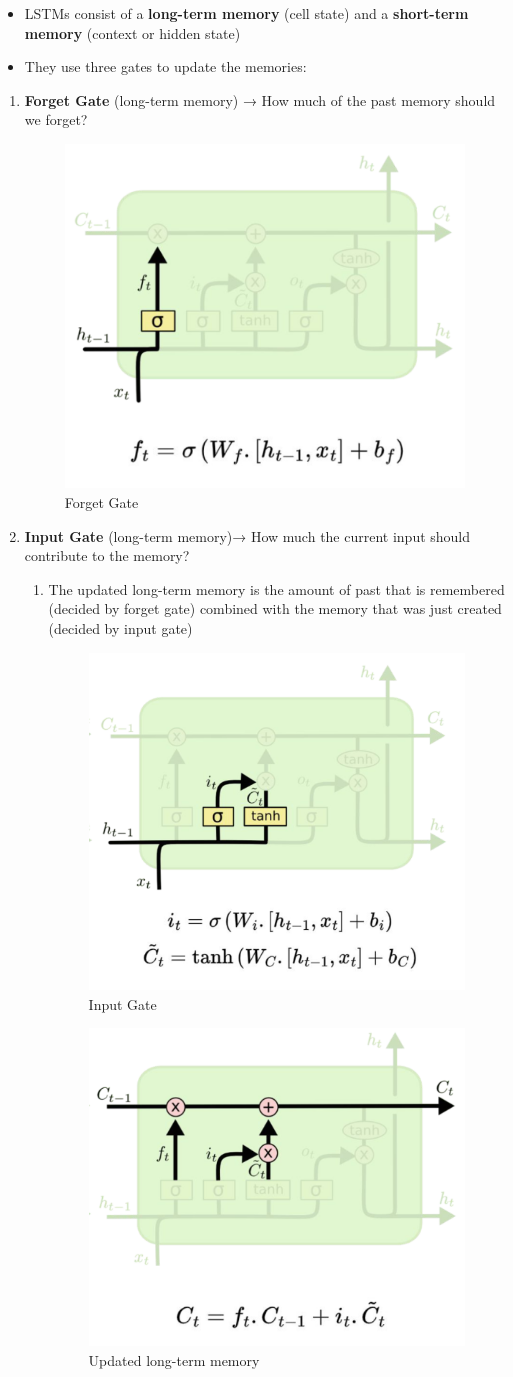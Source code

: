 \begin{itemize}
    \item LSTMs consist of a \textbf{long-term memory} (cell state) and a \textbf{short-term memory} (context
or hidden state)
\item They use three gates to update the memories:
\end{itemize}

\begin{enumerate}
    \item \textbf{Forget Gate} (long-term memory) → How much of the past memory should we forget?

\begin{figure}[h!t]
    \centering
    \includegraphics[width=0.4\linewidth]{forgetgate.png}
    \caption{Forget Gate}
    \label{fig:enter-label}
\end{figure}

    \item \textbf{Input Gate }(long-term memory)→ How much the current input should contribute to
the memory?
\begin{enumerate}
    \item The updated long-term memory is the amount of past that is remembered (decided by forget gate) combined with the memory that was just created (decided by input gate)

\begin{figure}[h!t]
    \centering
    \includegraphics[width=0.4\linewidth]{inputgate.png}
    \caption{Input Gate}
    \label{fig:enter-label}
\end{figure}
\newpage
\begin{figure}[h!t]
    \centering
    \includegraphics[width=0.4\linewidth]{updatedlongterm.png}
    \caption{Updated long-term memory}
    \label{fig:enter-label}
\end{figure}


\end{enumerate}
\end{enumerate}
